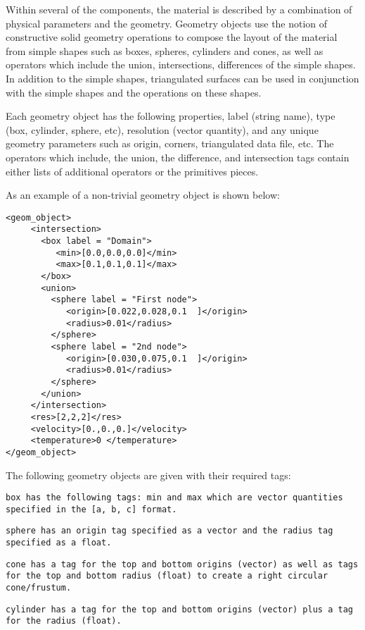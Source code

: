 Within several of the components, the material is described by a
combination of physical parameters and the geometry.  Geometry objects
use the notion of constructive solid geometry operations to compose
the layout of the material from simple shapes such as boxes, spheres,
cylinders and cones, as well as operators which include the union,
intersections, differences of the simple shapes.  In addition to the
simple shapes, triangulated surfaces can be used in conjunction with
the simple shapes and the operations on these shapes.

Each geometry object has the following properties, label (string
name), type (box, cylinder, sphere, etc), resolution (vector
quantity), and any unique geometry parameters such as origin, corners,
triangulated data file, etc.  The operators which include, the union,
the difference, and intersection tags contain either lists of
additional operators or the primitives pieces.

As an example of a non-trivial geometry object is shown below:

\begin{Verbatim}[fontsize=\footnotesize]
<geom_object>
     <intersection>
       <box label = "Domain">
          <min>[0.0,0.0,0.0]</min>
          <max>[0.1,0.1,0.1]</max>
       </box>
       <union>
         <sphere label = "First node">
            <origin>[0.022,0.028,0.1  ]</origin>
            <radius>0.01</radius>
         </sphere>
         <sphere label = "2nd node">
            <origin>[0.030,0.075,0.1  ]</origin>
            <radius>0.01</radius>
         </sphere>
       </union>
     </intersection>
     <res>[2,2,2]</res>
     <velocity>[0.,0.,0.]</velocity>
     <temperature>0 </temperature>
</geom_object>
\end{Verbatim}

The following geometry objects are given with their required tags:

\tt box \normalfont has the following tags: min and max which are
vector quantities specified in the \tt [a, b, c] \normalfont format.

\tt sphere \normalfont has an origin tag specified as a vector and the
radius tag specified as a float.

\tt cone \normalfont has a tag for the top and bottom origins (vector)
as well as tags for the top and bottom radius (float) to create a
right circular cone/frustum.

\tt cylinder \normalfont has a tag for the top and bottom origins
(vector) plus a tag for the radius (float).

